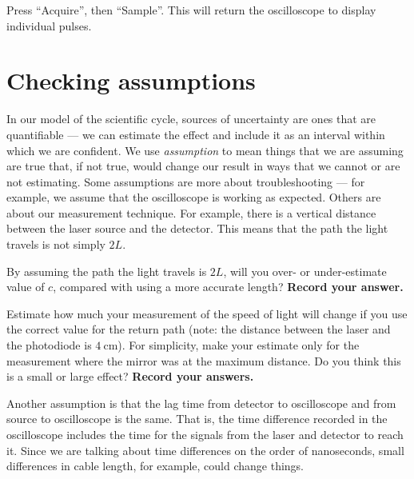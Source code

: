 \begin{steps}

	\item Press “Acquire”, then “Sample”. This will return the oscilloscope to display individual pulses.

\end{steps}

\section{Checking assumptions}

In our model of the scientific cycle, sources of uncertainty are ones that are quantifiable --- we can estimate the effect and include it as an interval within which we are confident. We use \textit{assumption} to mean things that we are assuming are true that, if not true, would change our result in ways that we cannot or are not estimating. Some assumptions are more about troubleshooting --- for example, we assume that the oscilloscope is working as expected. Others are about our measurement technique. For example, there is a vertical distance between the laser source and the detector. This means that the path the light travels is not simply $2L$.

\begin{steps}
	
	\item By assuming the path the light travels is $2L$, will you over- or under-estimate value of $c$, compared with using a more accurate length? \textbf{Record your answer.}
	
	\item Estimate how much your measurement of the speed of light will change if you use the correct value for the return path (note: the distance between the laser and the photodiode is $4\:$cm). For simplicity, make your estimate only for the measurement where the mirror was at the maximum distance. Do you think this is a small or large effect? \textbf{Record your answers.}
	
\end{steps}

Another assumption is that the lag time from detector to oscilloscope and from source to oscilloscope is the same. That is, the time difference recorded in the oscilloscope includes the time for the signals from the laser and detector to reach it. Since we are talking about time differences on the  order of nanoseconds, small differences in cable length, for example, could change things.

